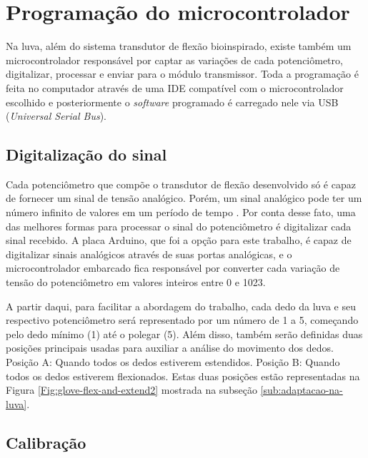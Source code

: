 \documentclass[
	12pt,				%
	openright,			%
	oneside,			%
	a4paper,			%
	english,			%
	brazil				%
	]{abntex2}
\begin{document}
	
		\section{Programação do microcontrolador}

		Na luva, além do sistema transdutor de flexão bioinspirado, existe também um microcontrolador responsável por captar as variações de cada potenciômetro, digitalizar, processar e enviar para o módulo transmissor. Toda a programação é feita no computador através de uma IDE compatível com o microcontrolador escolhido e posteriormente o \textit{software} programado é carregado nele via USB (\textit{Universal Serial Bus}).  
		
		\subsection{Digitalização do sinal}

		Cada potenciômetro que compõe o transdutor de flexão desenvolvido só é capaz de fornecer um sinal de tensão analógico. Porém, um sinal analógico pode ter um número infinito de valores em um período de tempo \cite{forouzan2009comunicacao}. Por conta desse fato, uma das melhores formas para processar o sinal do potenciômetro é digitalizar cada sinal recebido. A placa Arduino, que foi a opção para este trabalho, é capaz de digitalizar sinais analógicos através de suas portas analógicas, e o microcontrolador embarcado fica responsável por converter cada variação de tensão do potenciômetro em valores inteiros entre 0 e 1023. 

		A partir daqui, para facilitar a abordagem do trabalho, cada dedo da luva e seu respectivo potenciômetro será representado por um número de 1 a 5, começando pelo dedo mínimo (1) até o polegar (5). Além disso, também serão definidas duas posições principais usadas para auxiliar a análise do movimento dos dedos. Posição A: Quando todos os dedos estiverem estendidos. Posição B: Quando todos os dedos estiverem flexionados. Estas duas posições estão representadas na Figura \ref{Fig:glove-flex-and-extend2} mostrada na subseção \ref{sub:adaptacao-na-luva}.

				
		\subsection{Calibração}
\end{document}

